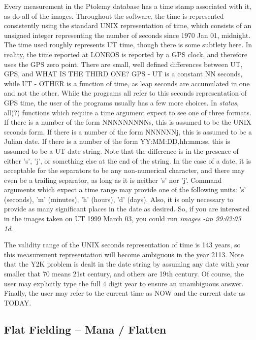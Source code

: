\documentclass{article}
\newcommand\pr{\em}                   %
\begin{document}
Every measurement in the Ptolemy database has a time stamp associated
with it, as do all of the images.  Throughout the software, the time
is represented consistently using the standard UNIX representation of
time, which consists of an unsigned integer representing the number of
seconds since 1970 Jan 01, midnight.  The time used roughly represents
UT time, though there is some subtlety here.  In reality, the time
reported at LONEOS is reported by a GPS clock, and therefore uses the
GPS zero point.  There are small, well defined differences between UT,
GPS, and WHAT IS THE THIRD ONE?  GPS - UT is a constant NN seconds,
while UT - OTHER is a function of time, as leap seconds are
accumulated in one and not the other.  While the programs all refer to
this seconds representation of GPS time, the user of the programs
usually has a few more choices.  In {\pr status}, all(?) functions
which require a time argument expect to see one of three formats. If
there is a number of the form NNNNNNNNNs, this is assumed to be the
UNIX seconds form.  If there is a number of the form NNNNNNj, this is
assumed to be a Julian date.  If there is a number of the form
YY:MM:DD,hh:mm:ss, this is assumed to be a UT date string.  Note that
the difference is in the presence of either 's', 'j', or something
else at the end of the string.  In the case of a date, it is
acceptable for the separators to be any non-numerical character, and
there may even be a trailing separator, as long as it is neither 's'
nor 'j'.  Command arguments which expect a time range may provide one
of the following units: 's' (seconds), 'm' (minutes), 'h' (hours), 'd'
(days).  Also, it is only necessary to provide as many significant
places in the date as desired.  So, if you are interested in the
images taken on UT 1999 March 03, you could run {\pr images -im
99:03:03 1d}.  

The validity range of the UNIX seconds representation of time is 143
years, so this measurement representation will become ambiguous in the
year 2113.  Note that the Y2K problem is dealt in the date string by
assuming any date with year smaller that 70 means 21st century, and
others are 19th century.  Of course, the user may explicitly type the
full 4 digit year to ensure an unambiguous answer.  Finally, the user
may refer to the current time as NOW and the current date as TODAY.

\subsection{Flat Fielding -- Mana / Flatten}
\end{document}
